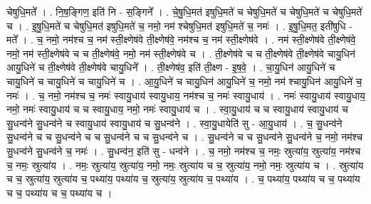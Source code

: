 \documentclass[17pt]{extarticle}
\begin{document}
चेषुधि॒मते᳚ । . नि॒ष॒ङ्गिण॒ इति॑ नि - स॒ङ्गिने᳚ । . चे॒षु॒धि॒मत॑ इषुधि॒मते॑ च चेषुधि॒मते॑ च चेषुधि॒मते॑ च चेषुधि॒मते॑ च । . इ॒षु॒धि॒मते॑ च चेषुधि॒मत॑ इषुधि॒मते॑ च॒ नमो॒ नम॑ श्चेषुधि॒मत॑ इषुधि॒मते॑ च॒ नमः॑ । . इ॒षु॒धि॒मत॒ इती॑षुधि - मते᳚ । . च॒ नमो॒ नम॑श्च च॒ नम॑ स्ती॒क्ष्णेष॑वे ती॒क्ष्णेष॑वे॒ नम॑श्च च॒ नम॑ स्ती॒क्ष्णेष॑वे । . नम॑ स्ती॒क्ष्णेष॑वे ती॒क्ष्णेष॑वे॒ नमो॒ नम॑ स्ती॒क्ष्णेष॑वे च च ती॒क्ष्णेष॑वे॒ नमो॒ नम॑ स्ती॒क्ष्णेष॑वे च । . ती॒क्ष्णेष॑वे च च ती॒क्ष्णेष॑वे ती॒क्ष्णेष॑वे चायु॒धिन॑ आयु॒धिने॑ च ती॒क्ष्णेष॑वे ती॒क्ष्णेष॑वे चायु॒धिने᳚ । . ती॒क्ष्णेष॑व॒ इति॑ ती॒क्ष्ण - इ॒ष॒वे॒ । . चा॒यु॒धिन॑ आयु॒धिने॑ च चायु॒धिने॑ च चायु॒धिने॑ च चायु॒धिने॑ च । . आ॒यु॒धिने॑ च चायु॒धिन॑ आयु॒धिने॑ च॒ नमो॒ नम॑ श्चायु॒धिन॑ आयु॒धिने॑ च॒ नमः॑ । . च॒ नमो॒ नम॑श्च च॒ नमः॑ स्वायु॒धाय॑ स्वायु॒धाय॒ नम॑श्च च॒ नमः॑ स्वायु॒धाय॑ । . नमः॑ स्वायु॒धाय॑ स्वायु॒धाय॒ नमो॒ नमः॑ स्वायु॒धाय॑ च च स्वायु॒धाय॒ नमो॒ नमः॑ स्वायु॒धाय॑ च । . स्वा॒यु॒धाय॑ च च स्वायु॒धाय॑ स्वायु॒धाय॑ च सु॒धन्व॑ने सु॒धन्व॑ने च स्वायु॒धाय॑ स्वायु॒धाय॑ च सु॒धन्व॑ने । . स्वा॒यु॒धायेति॑ सु - आ॒यु॒धाय॑ । . च॒ सु॒धन्व॑ने सु॒धन्व॑ने च च सु॒धन्व॑ने च च सु॒धन्व॑ने च च सु॒धन्व॑ने च । . सु॒धन्व॑ने च च सु॒धन्व॑ने सु॒धन्व॑ने च॒ नमो॒ नम॑श्च सु॒धन्व॑ने सु॒धन्व॑ने च॒ नमः॑ । . सु॒धन्व॑न॒ इति॑ सु - धन्व॑ने । . च॒ नमो॒ नम॑श्च च॒ नमः॒ स्रुत्या॑य॒ स्रुत्या॑य॒ नम॑श्च च॒ नमः॒ स्रुत्या॑य । . नमः॒ स्रुत्या॑य॒ स्रुत्या॑य॒ नमो॒ नमः॒ स्रुत्या॑य च च॒ स्रुत्या॑य॒ नमो॒ नमः॒ स्रुत्या॑य च । . स्रुत्या॑य च च॒ स्रुत्या॑य॒ स्रुत्या॑य च॒ पथ्या॑य॒ पथ्या॑य च॒ स्रुत्या॑य॒ स्रुत्या॑य च॒ पथ्या॑य । . च॒ पथ्या॑य॒ पथ्या॑य च च॒ पथ्या॑य च च॒ पथ्या॑य च च॒ पथ्या॑य च । \newline
\end{document}
